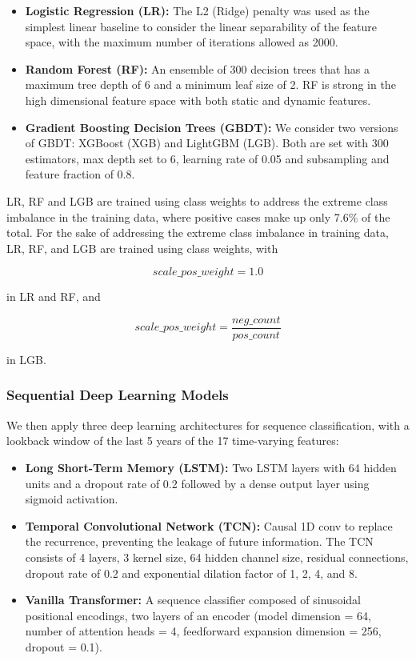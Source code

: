 \documentclass{ieeeaccess}
\begin{document}
\begin{itemize}

\item \textbf{Logistic Regression (LR):} The L2 (Ridge) penalty was used as the simplest linear baseline to consider the linear separability of the feature space, with the maximum number of iterations allowed as 2000.

\item \textbf{Random Forest (RF):} An ensemble of 300 decision trees that has a maximum tree depth of 6 and a minimum leaf size of 2. RF is strong in the high dimensional feature space with both static and dynamic features.

\item \textbf{Gradient Boosting Decision Trees (GBDT):} We consider two versions of GBDT: XGBoost (XGB) and LightGBM (LGB). Both are set with 300 estimators, max depth set to 6, learning rate of 0.05 and subsampling and feature fraction of 0.8.

\end{itemize}

LR, RF and LGB are trained using class weights to address the extreme class imbalance in the training data, where positive cases make up only 7.6\% of the total. For the sake of addressing the extreme class imbalance in training data, LR, RF, and LGB are trained using class weights, with

\[
scale\_pos\_weight = 1.0
\]

in LR and RF, and

\[
scale\_pos\_weight =
\frac{neg\_count}{pos\_count}
\]

in LGB.

\subsubsection{Sequential Deep Learning Models}

We then apply three deep learning architectures for sequence classification, with a lookback window of the last 5 years of the 17 time-varying features:

\begin{itemize}

\item \textbf{Long Short-Term Memory (LSTM):} Two LSTM layers with 64 hidden units and a dropout rate of 0.2 followed by a dense output layer using sigmoid activation.

\item \textbf{Temporal Convolutional Network (TCN):} Causal 1D conv to replace the recurrence, preventing the leakage of future information. The TCN consists of 4 layers, 3 kernel size, 64 hidden channel size, residual connections, dropout rate of 0.2 and exponential dilation factor of 1, 2, 4, and 8.

\item \textbf{Vanilla Transformer:} A sequence classifier composed of sinusoidal positional encodings, two layers of an encoder (model dimension = 64, number of attention heads = 4, feedforward expansion dimension = 256, dropout = 0.1).

\end{itemize}
\end{document}
